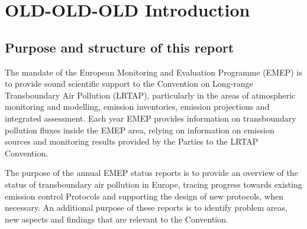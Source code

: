 \chapter[Introduction]{OLD-OLD-OLD Introduction}
\label{ch:Intro}

\section{Purpose and structure of this report}

The mandate of the European Monitoring and Evaluation Programme (EMEP)
is to provide sound scientific support to the Convention on Long-range
Transboundary Air Pollution (LRTAP), particularly in the areas of
atmospheric monitoring and modelling, emission inventories, emission
projections and integrated assessment. Each year EMEP provides
information on transboundary pollution fluxes inside the
EMEP area, relying on information on emission sources and
monitoring results provided by the Parties to the LRTAP Convention.

The purpose of the annual EMEP status reports is to provide an
overview of the status of transboundary air pollution in Europe,
tracing progress towards existing emission control Protocols and
supporting the design of new protocols, when necessary. An additional
purpose of these reports is to identify problem areas, new aspects
and findings that are relevant to the Convention.




